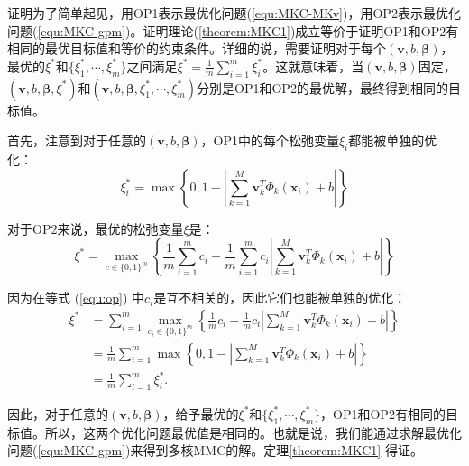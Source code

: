 {证明}\hspace{1em}为了简单起见，用OP1表示最优化问题(\ref{equ:MKC-MKv})，用OP2表示最优化问题(\ref{equ:MKC-gpm})。证明理论(\ref{theorem:MKC1})成立等价于证明OP1和OP2有相同的最优目标值和等价的约束条件。详细的说，需要证明对于每个$(\mathbf{v},b,\mathbf{\beta})$，最优的$\xi^*$和$\{\xi^*_1,\cdots,\xi^*_m\}$之间满足$\xi^*=\frac{1}{m}\sum^m_{i=1}\xi^*_i$。这就意味着，当$(\mathbf{v},b,\mathbf{\beta})$固定，$(\mathbf{v},b,\mathbf{\beta},\xi^*)$和$(\mathbf{v},b,\mathbf{\beta},\xi^*_1,\cdots,\xi^*_m)$分别是OP1和OP2的最优解，最终得到相同的目标值。

首先，注意到对于任意的$(\mathbf{v},b,\mathbf{\beta})$，OP1中的每个松弛变量$\xi_i$都能被单独的优化：
\begin{equation}
\xi^*_i=\max\left\{0,1-\left |\sum^M_{k=1}\mathbf{v}_k^T\Phi_k(\mathbf{x}_i)+b \right |\right\}  \label{equ:op}
\end{equation}

对于OP2来说，最优的松弛变量$\xi$是：
\begin{equation}
\xi^*=\max_{c\in\{0,1\}^m}\left\{\frac{1}{m}\sum^m_{i=1}c_i-\frac{1}{m}\sum^m_{i=1}c_i\left |\sum^M_{k=1}\mathbf{v}_k^T\Phi_k(\mathbf{x}_i)+b \right |\right\}
\end{equation}

因为在等式 (\ref{equ:op}) 中$c_i$是互不相关的，因此它们也能被单独的优化：
\begin{equation}
\begin{aligned}
\xi^* & =\sum^m_{i=1}\max_{c_i\in\{0,1\}^m}\left\{\frac{1}{m}c_i-\frac{1}{m}c_i\left |\sum^M_{k=1}\mathbf{v}_k^T\Phi_k(\mathbf{x}_i)+b \right |\right\} \\
& = \frac{1}{m}\sum^m_{i=1}\max\left\{0,1-\left |\sum^M_{k=1}\mathbf{v}_k^T\Phi_k(\mathbf{x}_i)+b \right |\right\} \\
& = \frac{1}{m}\sum^m_{i=1}\xi^*_i.
\end{aligned}
\end{equation}

因此，对于任意的$(\mathbf{v},b,\mathbf{\beta})$，给予最优的$\xi^*$和$\{\xi^*_1,\cdots,\xi^*_m\}$，OP1和OP2有相同的目标值。所以，这两个优化问题最优值是相同的。也就是说，我们能通过求解最优化问题(\ref{equ:MKC-gpm})来得到多核MMC的解。定理\ref{theorem:MKC1} 得证。

